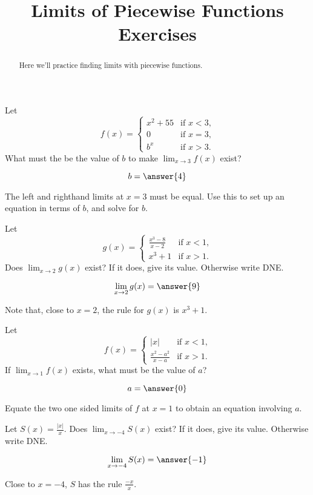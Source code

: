 \documentclass[handout]{ximera}
\title[Exercises:]{Limits of Piecewise Functions Exercises}
\begin{document}
\begin{abstract}
  Here we'll practice finding limits with piecewise functions.
\end{abstract}
\maketitle

\begin{exercise}
Let
\[
f(x) =
\begin{cases} x^2+55 &\text{if $x<3$,}\\
  0 &\text{if $x=3$,} \\
  b^x &\text{if $x>3$.}
\end{cases}
\]  
What must the be the value of $b$ to make $\displaystyle\lim_{x \to 3} f(x)$ exist?

\[
b = \answer{4}
\]

\begin{hint}
  The left and righthand limits at $x=3$ must be equal.  Use this to
  set up an equation in terms of $b$, and solve for $b$.
\end{hint}
\end{exercise}

\begin{exercise}
Let
\[
g(x) = \begin{cases}
  \frac{x^3 - 8}{x-2}  &\text{if $x<1$,} \\
  x^3+1 &\text{if  $x>1$.}
\end{cases}
\]
Does $\displaystyle\lim_{x \to 2} g(x)$ exist?  If it does, give its value.
Otherwise write DNE.

\[
\lim_{x \to 2} g(x) = \answer{9}
\]

\begin{hint}
	Note that, close to $x=2$, the rule for $g(x)$ is $x^3+1$.
\end{hint}

\end{exercise}


\begin{exercise}
Let
\[
f(x) = \begin{cases}
  |x| &\text{if $x<1$,} \\
  \frac{x^2-a^2}{x-a} &\text{if $x>1$.}
\end{cases}
\]
If $\displaystyle\lim_{x \to 1} f(x)$ exists, what must be the value of $a$?

  \[
a = \answer{0}
\]

\begin{hint}
  Equate the two one sided limits of $f$ at $x=1$ to obtain an equation involving $a$.
\end{hint}

\end{exercise}

\begin{exercise}
Let $S(x) = \frac{|x|}{x}$.  Does $\displaystyle\lim_{x \to -4} S(x)$ exist?  If it
does, give its value.  Otherwise write DNE.

\[
\lim_{x \to -4} S(x) = \answer{-1}
\] 

\begin{hint}
  Close to $x=-4$, $S$ has the rule $\frac{-x}{x}$.
\end{hint}


\end{exercise}
\end{document}
